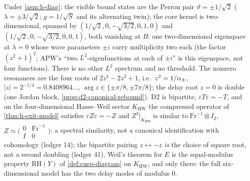 \begin{proposition}
\label{prop:d2-spectrum-frobenius}
Under \cref{asm:h-diag}: the visible bound states are the Perron pair $\vartheta = \pm1/\sqrt2$
($\lambda = \pm3/\sqrt2$; $g = 1/\sqrt{S}$ and its alternating twin); the core kernel is two-dimensional,
spanned by $(1/\sqrt2,0,-\sqrt{3/2},0,1,0)$ and $(1/\sqrt2,0,-\sqrt{3/2},0,0,1)$, both vanishing at $B$: one
two-dimensional eigenspace at $\lambda = 0$ whose wave parameters $\pm i$ carry multiplicity two each (the
factor $(z^2+1)^2$; APW's ``two $L^2$-eigenfunctions at each of $\pm i$'' is this eigenspace, not four
functions). There is no other $L^2$ spectrum and no threshold. The nonzero resonances are the four roots
of $2z^4-2z^2+1$, i.e.\ $z^2 = 1/\alpha_{\pm}$, $|z| = 2^{-1/4} = 0.8408964\ldots$, $\arg z\in\{\pm\pi/8,\pm7\pi/8\}$;
the delay root $z = 0$ is double (one Jordan block, \cref{prop:d2-canonical-rebound}). $\mathrm{D2}$ is
bipartite, $\varepsilon T\varepsilon = -T$, and on the four-dimensional Hasse--Weil sector $K_{\mathrm{HW}}$ the
compressed operator of \cref{thm:h-exit-model} satisfies $\varepsilon Z\varepsilon = -Z$ and
$Z^2|_{K_{\mathrm{HW}}}\ \text{is similar to}\ \mathrm{Fr}^{-1}\otimes I_2$, $Z\simeq\big(\begin{smallmatrix}
0&\mathrm{Fr}^{-1}\\I&0\end{smallmatrix}\big)$: a spectral similarity, not a canonical identification with
cohomology (ledger 14); the bipartite pairing $z\leftrightarrow-z$ \emph{is} the choice of square root, not
a second doubling (ledger 41). Weil's theorem for $E$ is the equal-modulus property $\mathrm{RH}(Y)$ of
\cref{def:cusp-diagram} on $K_{\mathrm{HW}}$, and only there: the full six-dimensional model has the two
delay modes of modulus $0$.
\end{proposition}

